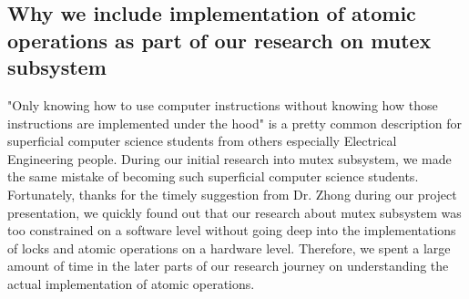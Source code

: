 \documentclass[10pt]{sigplanconf}
\begin{document}
\subsection{Why we include implementation of atomic operations as part of our research on mutex subsystem}
"Only knowing how to use computer instructions without knowing how those instructions are implemented under the hood" is a pretty common description for superficial computer science students from others especially Electrical Engineering people. During our initial research into mutex subsystem, we made the same mistake of becoming such superficial computer science students. \\
Fortunately, thanks for the timely suggestion from Dr. Zhong during our project presentation, we quickly found out that our research about mutex subsystem was too constrained on a software level without going deep into the implementations of locks and atomic operations on a hardware level. Therefore, we spent a large amount of time in the later parts of our research journey on understanding the actual implementation of atomic operations.
\end{document}
